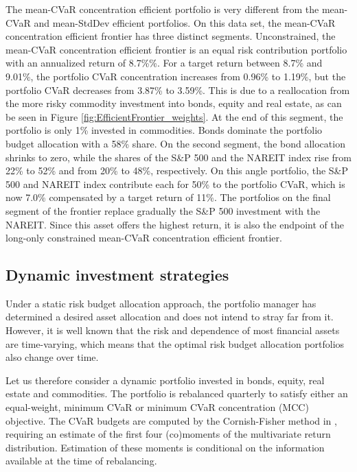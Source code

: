 \documentclass[12pt,a4paper]{article}
\begin{document}
The mean-CVaR concentration efficient portfolio is very different from the mean-CVaR and mean-StdDev efficient portfolios. On this data set, the mean-CVaR concentration efficient frontier has three distinct segments. Unconstrained, the mean-CVaR concentration efficient frontier is an equal risk contribution portfolio with an annualized return of 8.7\%\%. For a target return between 8.7\% and 9.01\%, the portfolio CVaR concentration increases from 0.96\% to 1.19\%, but the portfolio CVaR decreases from 3.87\% to 3.59\%. This is due to a reallocation from the more risky commodity investment into bonds, equity and real estate, as can be seen in Figure \ref{fig:EfficientFrontier_weights}. At the end of this segment, the portfolio is only 1\% invested in commodities. Bonds dominate the portfolio budget allocation with a 58\% share. On the second segment, the bond allocation shrinks to zero, while the shares of the S\&P 500 and the NAREIT index rise from 22\% to 52\% and from 20\% to 48\%, respectively. On this angle portfolio, the S\&P 500 and NAREIT index contribute each for 50\% to the portfolio CVaR, which is now 7.0\% compensated by a target return of 11\%. The portfolios on the final segment of the frontier replace gradually the S\&P 500 investment with the NAREIT. Since this asset offers the highest return, it is also the endpoint of the long-only constrained mean-CVaR concentration efficient frontier.

\clearpage
\subsection{Dynamic investment strategies}\label{subsec:dynamic}

Under a static risk budget allocation approach, the portfolio manager has determined a desired asset allocation and does not intend
to stray far from it. However, it is well known that the risk and dependence of most financial assets are time-varying, which means that the optimal risk budget allocation portfolios also change over time.

Let us therefore consider a dynamic portfolio invested in bonds, equity, real estate and commodities. The portfolio is rebalanced quarterly to satisfy either an equal-weight, minimum CVaR or minimum CVaR concentration (MCC) objective. The CVaR budgets are computed by the Cornish-Fisher method in \citet{Boudt2007}, requiring an estimate of the first four (co)moments of the multivariate return distribution. Estimation of these moments is conditional on the information available at the time of rebalancing.
\end{document}
